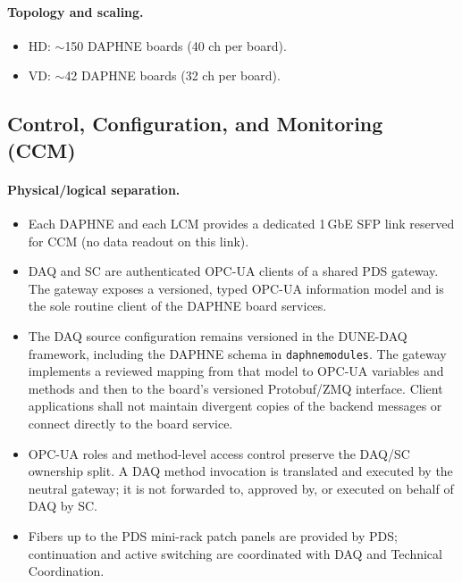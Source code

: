 \paragraph{Topology and scaling.}
\begin{itemize}[nosep]
  \item HD: \(\sim\)150 DAPHNE boards (40 ch per board).
  \item VD: \(\sim\)42 DAPHNE boards (32 ch per board).
\end{itemize}



\subsection{Control, Configuration, and Monitoring (CCM)}
\label{sec:ccm}

\paragraph{Physical/logical separation.}
\begin{itemize}[nosep]
  \item Each DAPHNE and each LCM provides a dedicated 1\,GbE SFP link reserved for CCM (no data readout on this link).
  \item DAQ and SC are authenticated OPC-UA clients of a shared PDS gateway. The gateway exposes a versioned, typed OPC-UA information model and is the sole routine client of the DAPHNE board services.
  \item The DAQ source configuration remains versioned in the DUNE-DAQ framework, including the DAPHNE schema in \texttt{daphnemodules}. The gateway implements a reviewed mapping from that model to OPC-UA variables and methods and then to the board's versioned Protobuf/ZMQ interface. Client applications shall not maintain divergent copies of the backend messages or connect directly to the board service.
  \item OPC-UA roles and method-level access control preserve the DAQ/SC ownership split. A DAQ method invocation is translated and executed by the neutral gateway; it is not forwarded to, approved by, or executed on behalf of DAQ by SC.
  \item Fibers up to the PDS mini-rack patch panels are provided by PDS; continuation and active switching are coordinated with DAQ and Technical Coordination.
\end{itemize}

